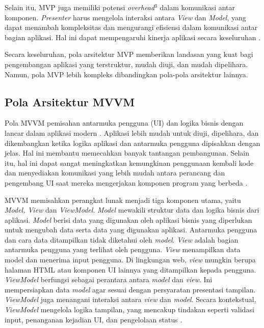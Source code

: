 \documentclass[conference]{IEEEtran}
\begin{document}
    Selain itu, MVP juga memiliki potensi  \textit{overhead}$^3$ dalam komunikasi antar komponen. \textit{Presenter} harus mengelola interaksi antara  \textit{View} dan \textit{Model}, yang dapat menambah kompleksitas dan mengurangi efisiensi dalam komunikasi antar bagian aplikasi. Hal ini dapat mempengaruhi kinerja aplikasi secara keseluruhan \cite{brp2020}.

    Secara keseluruhan, pola arsitektur MVP memberikan landasan yang kuat bagi pengembangan aplikasi yang terstruktur, mudah diuji, dan mudah dipelihara. Namun, pola MVP lebih kompleks dibandingkan pola-pola arsitektur lainnya.

    \thispagestyle{secondpagestyle}
 
	\subsection{Pola Arsitektur MVVM}
	Pola MVVM pemisahan antarmuka pengguna (UI) dan logika bisnis dengan lancar dalam aplikasi modern \cite{Kom2022,Car2022}. Aplikasi lebih mudah untuk diuji, dipelihara, dan dikembangkan ketika logika aplikasi dan antarmuka pengguna dipisahkan dengan jelas. Hal ini membantu memecahkan banyak tantangan pembangunan. Selain itu, hal ini dapat sangat meningkatkan kemungkinan penggunaan kembali kode dan menyediakan komunikasi yang lebih mudah antara perancang dan pengembang UI saat mereka mengerjakan komponen program yang berbeda \cite{michael2023}. 
	
	MVVM memisahkan perangkat lunak menjadi tiga komponen utama, yaitu \textit{Model, View} dan \textit{ViewModel}. \textit{Model} mewakili struktur data dan logika bisnis dari aplikasi. \textit{Model} berisi data yang digunakan oleh aplikasi bisnis yang diperlukan untuk mengubah data serta data yang digunakan aplikasi. Antarmuka pengguna dan cara data ditampilkan tidak diketahui oleh \textit{model}.
	\textit{View} adalah bagian antarmuka pengguna yang terlihat oleh pengguna. \textit{View} menampilkan data model dan menerima input pengguna. Di lingkungan web, \textit{view} mungkin berupa halaman HTML atau komponen UI lainnya yang ditampilkan kepada pengguna.
	\textit{ViewModel} berfungsi sebagai perantara antara \textit{model} dan \textit{view}. Ini mempersiapkan data \textit{model} agar sesuai dengan persyaratan presentasi tampilan. \textit{ViewModel} juga menangani interaksi antara \textit{view} dan \textit{model}. Secara kontekstual, \textit{ViewModel} mengelola logika tampilan, yang mencakup tindakan seperti validasi input, penanganan kejadian UI, dan pengelolaan status \cite{Martin2024}.
\end{document}
